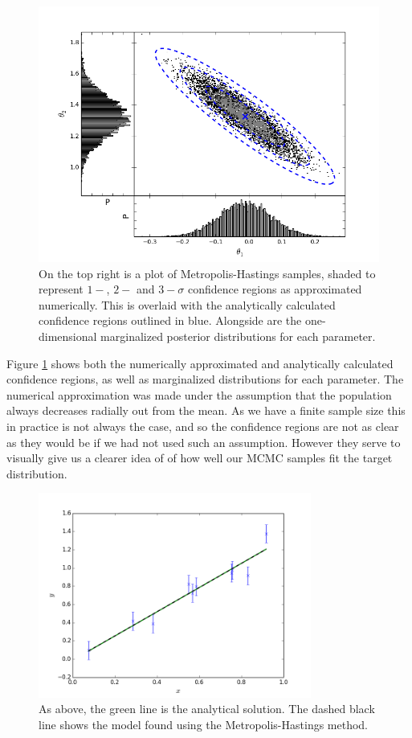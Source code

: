 \documentclass[a4paper,11pt,twoside]{article}
\begin{document}
\begin{figure}[!ht]
	\centering
	\includegraphics[width=\textwidth]{marginalized.png}
	\caption{On the top right is a plot of Metropolis-Hastings samples, shaded to
	represent $1-$, $2-$ and $3-\sigma$ confidence regions as approximated
	numerically. This is overlaid with the analytically calculated confidence
	regions outlined in blue. Alongside are the one-dimensional marginalized posterior
	distributions for each parameter.}
	\label{fig:marginalized}
\end{figure}

Figure \ref{fig:marginalized} shows both the numerically approximated and
analytically calculated confidence regions, as well as marginalized
distributions for each parameter. The numerical approximation was made under
the assumption that the population always decreases radially out from the mean.
As we have a finite sample size this in practice is not always the case, and so
the confidence regions are not as clear as they would be if we had not used
such an assumption. However they serve to visually give us a clearer idea of of
how well our MCMC samples fit the target distribution.

\begin{figure}[!ht]
	\centering
	\includegraphics[width=0.8\textwidth]{2ddata-mcmc.png}
	\caption{As above, the green line is the analytical solution. The
	dashed black line shows the model found using the Metropolis-Hastings
	method.}
	\label{fig:model-mcmc}
\end{figure}
\end{document}
